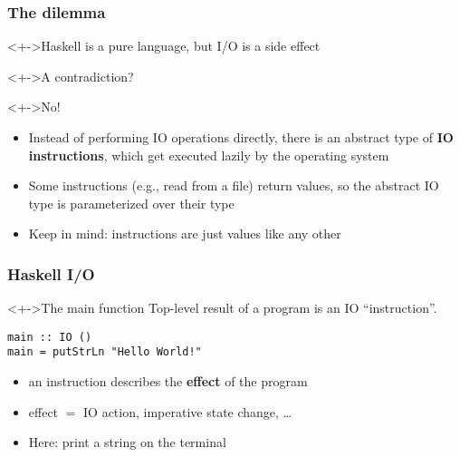 \documentclass{beamer}
\begin{document}
\begin{frame}[fragile]
  \frametitle{The dilemma}
  \begin{block}<+->{Haskell is a pure language, but I/O is a side effect}
  \end{block}
  \begin{block}<+->{A contradiction?}
  \end{block}
  \begin{block}<+->{No!}
    \begin{itemize}
    \item Instead of performing IO operations directly, there is an
      abstract type of \textbf{IO instructions}, which get executed
      lazily by the operating system
    \item Some instructions (e.g., read from a file) return values, so the abstract IO type is parameterized over their type
    \item Keep in mind: instructions are just values like any other
  \end{itemize}
  \end{block}
\end{frame}
\begin{frame}[fragile]
  \frametitle{Haskell I/O}

\begin{block}<+->{The main function}
  Top-level result of a program is an IO ``instruction''.
\begin{lstlisting}
main :: IO ()
main = putStrLn "Hello World!"
\end{lstlisting}
  \begin{itemize}
  \item an instruction describes the \textbf{effect} of the program
  \item effect $=$ IO action, imperative state change, \dots
  \item Here: print a string on the terminal
  \end{itemize}
\end{block}
\end{frame}
\end{document}
